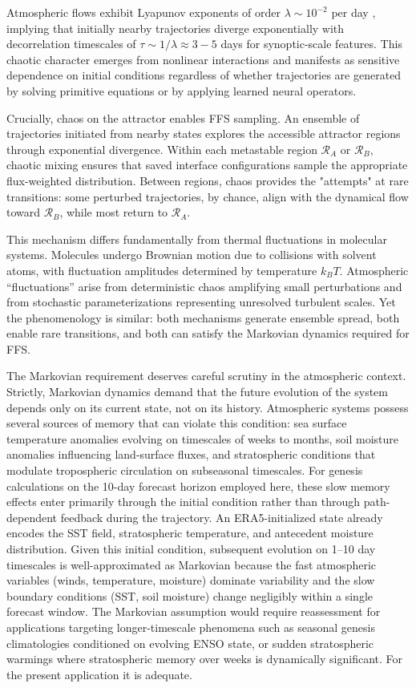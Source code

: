 \documentclass[11pt]{article}
\begin{document}
Atmospheric flows exhibit Lyapunov exponents of order $\lambda \sim 10^{-2}$ per day \citep{lorenz1969atmospheric}, implying that initially nearby trajectories diverge exponentially with decorrelation timescales of $\tau \sim 1/\lambda \approx 3-5$ days for synoptic-scale features. This chaotic character emerges from nonlinear interactions and manifests as sensitive dependence on initial conditions regardless of whether trajectories are generated by solving primitive equations or by applying learned neural operators.

Crucially, chaos on the attractor enables FFS sampling. An ensemble of trajectories initiated from nearby states explores the accessible attractor regions through exponential divergence. Within each metastable region $\mathcal{R}_A$ or $\mathcal{R}_B$, chaotic mixing ensures that saved interface configurations sample the appropriate flux-weighted distribution. Between regions, chaos provides the "attempts" at rare transitions: some perturbed trajectories, by chance, align with the dynamical flow toward $\mathcal{R}_B$, while most return to $\mathcal{R}_A$.

This mechanism differs fundamentally from thermal fluctuations in molecular systems. Molecules undergo Brownian motion due to collisions with solvent atoms, with fluctuation amplitudes determined by temperature $k_BT$. Atmospheric ``fluctuations'' arise from deterministic chaos amplifying small perturbations and from stochastic parameterizations representing unresolved turbulent scales. Yet the phenomenology is similar: both mechanisms generate ensemble spread, both enable rare transitions, and both can satisfy the Markovian dynamics required for FFS.

The Markovian requirement deserves careful scrutiny in the atmospheric context. Strictly, Markovian dynamics demand that the future evolution of the system depends only on its current state, not on its history. Atmospheric systems possess several sources of memory that can violate this condition: sea surface temperature anomalies evolving on timescales of weeks to months, soil moisture anomalies influencing land-surface fluxes, and stratospheric conditions that modulate tropospheric circulation on subseasonal timescales. For genesis calculations on the 10-day forecast horizon employed here, these slow memory effects enter primarily through the initial condition rather than through path-dependent feedback during the trajectory. An ERA5-initialized state already encodes the SST field, stratospheric temperature, and antecedent moisture distribution. Given this initial condition, subsequent evolution on 1--10 day timescales is well-approximated as Markovian because the fast atmospheric variables (winds, temperature, moisture) dominate variability and the slow boundary conditions (SST, soil moisture) change negligibly within a single forecast window. The Markovian assumption would require reassessment for applications targeting longer-timescale phenomena such as seasonal genesis climatologies conditioned on evolving ENSO state, or sudden stratospheric warmings where stratospheric memory over weeks is dynamically significant. For the present application it is adequate.
\end{document}
